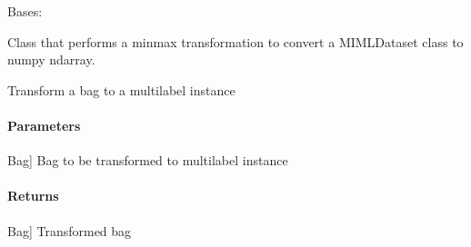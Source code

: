 \documentclass[letterpaper,10pt,english]{sphinxmanual}
\begin{document}
\begin{fulllineitems}
\label{\detokenize{transformation/mimlTOml/_autosummary/miml.transformation.mimlTOml.minmax.MinMaxTransformation:miml.transformation.mimlTOml.minmax.MinMaxTransformation}}
\pysigstartsignatures
{}
\pysigstopsignatures
\sphinxAtStartPar
Bases: {\hyperref[\detokenize{transformation/mimlTOml/_autosummary/miml.transformation.mimlTOml.miml_to_ml_transformation.MIMLtoMLTransformation:miml.transformation.mimlTOml.miml_to_ml_transformation.MIMLtoMLTransformation}]{}}

\sphinxAtStartPar
Class that performs a minmax transformation to convert a MIMLDataset class to numpy ndarray.

\begin{fulllineitems}
\label{\detokenize{transformation/mimlTOml/_autosummary/miml.transformation.mimlTOml.minmax.MinMaxTransformation:miml.transformation.mimlTOml.minmax.MinMaxTransformation.transform_bag}}
\pysigstartsignatures
{}
\pysigstopsignatures
\sphinxAtStartPar
Transform a bag to a multilabel instance


\paragraph{Parameters}
\label{\detokenize{transformation/mimlTOml/_autosummary/miml.transformation.mimlTOml.minmax.MinMaxTransformation:parameters}}\begin{description}
\sphinxlineitem{bag}{[}Bag{]}
\sphinxAtStartPar
Bag to be transformed to multilabel instance

\end{description}


\paragraph{Returns}
\label{\detokenize{transformation/mimlTOml/_autosummary/miml.transformation.mimlTOml.minmax.MinMaxTransformation:returns}}\begin{description}
\sphinxlineitem{transformed\_bag}{[}Bag{]}
\sphinxAtStartPar
Transformed bag


\end{description}
\end{fulllineitems}
\end{fulllineitems}
\end{document}
